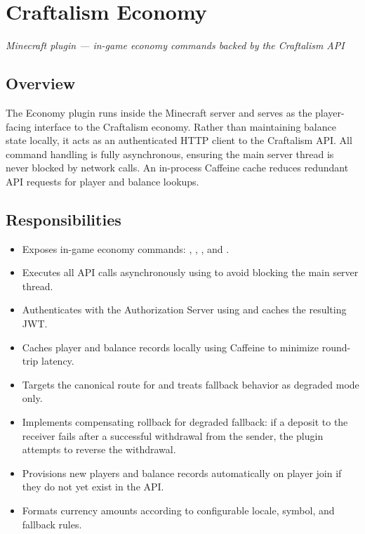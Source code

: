

\chapter{Craftalism Economy}
\label{ch:economy}


\textcolor{CraftGray}{\textit{Minecraft plugin — in-game economy commands backed by the Craftalism API}}

\bigskip

\section{Overview}

The Economy plugin runs inside the Minecraft server and serves as the player-facing interface to the Craftalism economy. Rather than maintaining balance state locally, it acts as an authenticated HTTP client to the Craftalism API. All command handling is fully asynchronous, ensuring the main server thread is never blocked by network calls. An in-process Caffeine cache reduces redundant API requests for player and balance lookups.

\section{Responsibilities}

\begin{itemize}
  \item Exposes in-game economy commands: , , , and .
  \item Executes all API calls asynchronously using  to avoid blocking the main server thread.
  \item Authenticates with the Authorization Server using  and caches the resulting JWT.
  \item Caches player and balance records locally using Caffeine to minimize round-trip latency.
  \item Targets the canonical  route for  and treats fallback behavior as degraded mode only.
  \item Implements compensating rollback for degraded  fallback: if a deposit to the receiver fails after a successful withdrawal from the sender, the plugin attempts to reverse the withdrawal.
  \item Provisions new players and balance records automatically on player join if they do not yet exist in the API.
  \item Formats currency amounts according to configurable locale, symbol, and fallback rules.
\end{itemize}


